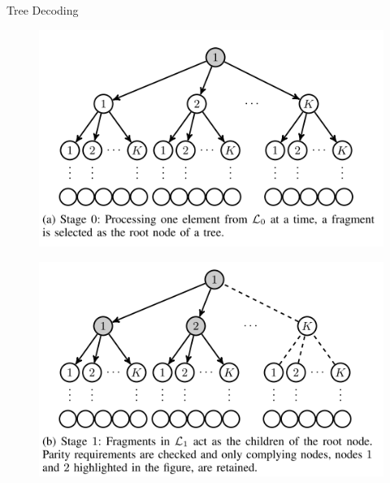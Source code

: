 \documentclass[aspectratio=169, handout, 10pt, hyperref=colorlinks]{beamer}
\begin{document}
 
\begin{frame}{Tree Decoding}
    \begin{figure}
        \centering
        \begin{minipage}[b]{0.4\linewidth}
            \centering
            \includegraphics[width=\linewidth]{images_CCS/fig4a.png}
            \label{fig:fig1}
        \end{minipage}
        \hfill
        \begin{minipage}[b]{0.4\linewidth}
            \centering
            \includegraphics[width=\linewidth]{images_CCS/fig4b.png}
            \label{fig:fig2}
        \end{minipage}
    \end{figure}
    

\end{frame}
\end{document}
